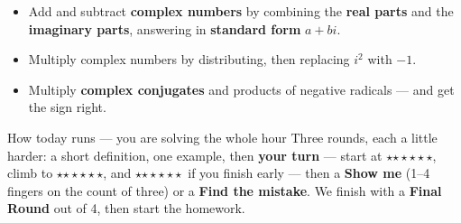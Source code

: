 \documentclass[aspectratio=169, 11pt]{beamer}
\newcommand{\rung}[1]{{\color{goldacc}\ifcase#1\or$\star$\or$\star\star$\or$\star\star\star$\fi}}
\begin{document}
\begin{frame}[t, plain]
  \begin{itemize}\setlength{\itemsep}{4pt}
    \item Add and subtract \textbf{complex numbers} by combining the \textbf{real parts} and the
          \textbf{imaginary parts}, answering in \textbf{standard form} $a+bi$.
    \item Multiply complex numbers by distributing, then replacing $i^2$ with $-1$.
    \item Multiply \textbf{complex conjugates} and products of negative radicals --- and get the
          sign right.
  \end{itemize}
  \vspace{3pt}
  \begin{block}{How today runs --- you are solving the whole hour}
    Three rounds, each a little harder: a short definition, one example, then \textbf{your turn}
    --- start at \rung1, climb to \rung2, and \rung3\ if you finish early --- then a \textbf{Show
    me} (1--4 fingers on the count of three) or a \textbf{Find the mistake}. We finish with a
    \textbf{Final Round} out of 4, then start the homework.
  \end{block}
\end{frame}
\end{document}
